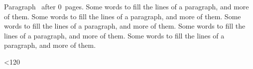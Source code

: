 \documentclass{article}
\def\x{0}
\def\t{Some words to fill the lines of a paragraph, and more of them. }
\begin{document}
\begingroup
\loop \advance{} Paragraph \the\n\ after \x\ pages. \t\t\t\t\t\par
\ifnum\n<120 \repeat
\endgroup
\end{document}
